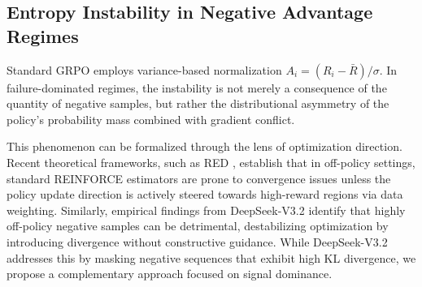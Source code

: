 \subsection{Entropy Instability in Negative Advantage Regimes}
\label{sec:analysis_positive}
Standard GRPO employs variance-based normalization $A_i = (R_i - \bar{R})/\sigma$. In failure-dominated regimes, the instability is not merely a consequence of the quantity of negative samples, but rather the distributional asymmetry of the policy's probability mass combined with gradient conflict.

This phenomenon can be formalized through the lens of optimization direction. Recent theoretical frameworks, such as RED \cite{yao2025group}, establish that in off-policy settings, standard REINFORCE estimators are prone to convergence issues unless the policy update direction is actively steered towards high-reward regions via data weighting. Similarly, empirical findings from DeepSeek-V3.2 \cite{liu2025deepseek32} identify that highly off-policy negative samples can be detrimental, destabilizing optimization by introducing divergence without constructive guidance. While DeepSeek-V3.2 addresses this by masking negative sequences that exhibit high KL divergence, we propose a complementary approach focused on signal dominance.

